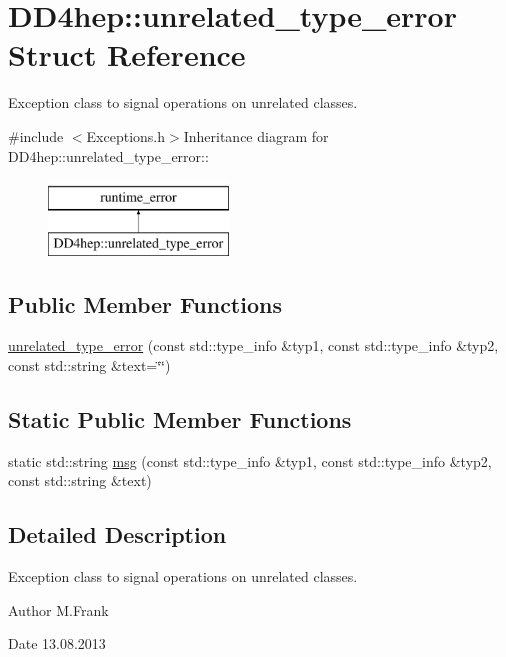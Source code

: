 \hypertarget{struct_d_d4hep_1_1unrelated__type__error}{
\section{DD4hep::unrelated\_\-type\_\-error Struct Reference}
\label{struct_d_d4hep_1_1unrelated__type__error}
}


Exception class to signal operations on unrelated classes.  


{\ttfamily \#include $<$Exceptions.h$>$}Inheritance diagram for DD4hep::unrelated\_\-type\_\-error::\begin{figure}[H]
\begin{center}
\leavevmode
\includegraphics[height=2cm]{struct_d_d4hep_1_1unrelated__type__error}
\end{center}
\end{figure}
\subsection*{Public Member Functions}
\begin{DoxyCompactItemize}
\item 
\hyperlink{struct_d_d4hep_1_1unrelated__type__error_a53f8227fa75c1552d30b3d43e104a2ba}{unrelated\_\-type\_\-error} (const std::type\_\-info \&typ1, const std::type\_\-info \&typ2, const std::string \&text=\char`\"{}\char`\"{})
\end{DoxyCompactItemize}
\subsection*{Static Public Member Functions}
\begin{DoxyCompactItemize}
\item 
static std::string \hyperlink{struct_d_d4hep_1_1unrelated__type__error_a5d9a561a8473ee52610cd10777878862}{msg} (const std::type\_\-info \&typ1, const std::type\_\-info \&typ2, const std::string \&text)
\end{DoxyCompactItemize}


\subsection{Detailed Description}
Exception class to signal operations on unrelated classes. \begin{DoxyAuthor}{Author}
M.Frank 
\end{DoxyAuthor}
\begin{DoxyDate}{Date}
13.08.2013 
\end{DoxyDate}


